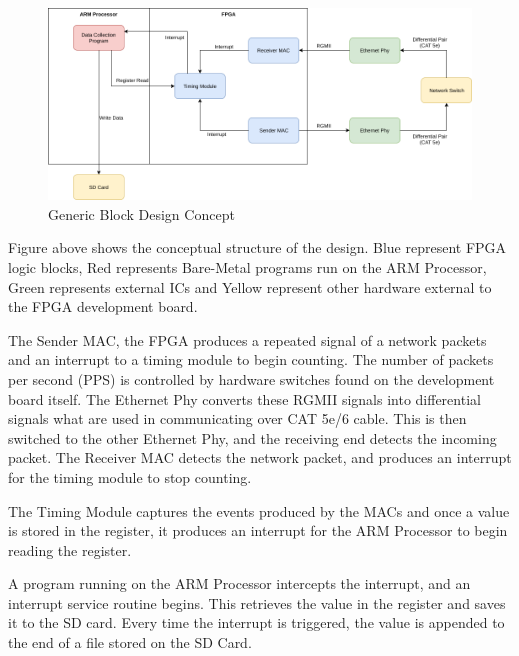 \begin{figure}[H]
    \begin{center}
        \includegraphics[keepaspectratio,width=15cm]{Images/BlockDesignConcept}
        \caption{Generic Block Design Concept}
        \label{fig:blockdesignconcept}
    \end{center}
\end{figure}

\par Figure above shows the conceptual structure of the design. Blue represent FPGA logic blocks, Red represents 
Bare-Metal programs run on the ARM Processor, Green represents external ICs and Yellow represent other hardware 
external to the FPGA development board.

\par The Sender MAC, the FPGA produces a repeated signal of a network packets and an interrupt to a timing module to 
begin counting. The number of packets per second (PPS) is controlled by hardware switches found on the development 
board itself. The Ethernet Phy converts these RGMII signals into differential signals what are used in communicating 
over CAT 5e/6 cable. This is then switched to the other Ethernet Phy, and the receiving end detects the incoming 
packet. The Receiver MAC detects the network packet, and produces an interrupt for the timing module to stop counting.

\par The Timing Module captures the events produced by the MACs and once a value is stored in the register, it 
produces an interrupt for the ARM Processor to begin reading the register. 

\par A program running on the ARM Processor intercepts the interrupt, and an interrupt service routine begins. This 
retrieves the value in the register and saves it to the SD card. Every time the interrupt is triggered, the value is 
appended to the end of a file stored on the SD Card. 

